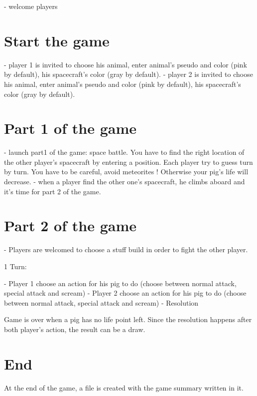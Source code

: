- welcome players


\section{Start the game}

- player 1 is invited to choose his animal, enter animal's pseudo and color (pink by default), his spacecraft's color (gray by default).
- player 2 is invited to choose his animal, enter animal's pseudo and color (pink by default), his spacecraft's color (gray by default).


\section{Part 1 of the game}

- launch part1 of the game: space battle. You have to find the right location of the other player's spacecraft by entering a position. Each player try to guess turn by turn. You have to be careful, avoid meteorites ! Otherwise your pig's life will decrease.
- when a player find the other one's spacecraft, he climbs aboard and it's time for part 2 of the game.


\section{Part 2 of the game}

- Players are welcomed to choose a stuff build in order to fight the other player.

1 Turn:

- Player 1 choose an action for his pig to do (choose between normal attack, special attack and scream)
- Player 2 choose an action for his pig to do (choose between normal attack, special attack and scream)
- Resolution

Game is over when a pig has no life point left. Since the resolution happens after both player's action, the result can be a draw.

\section{End}

At the end of the game, a file is created with the game summary written in it.


